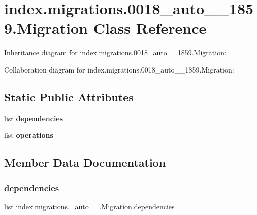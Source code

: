 \hypertarget{classindex_1_1migrations_1_10018__auto__20171025__1859_1_1Migration}{}\section{index.\+migrations.0018\+\_\+auto\+\_\+\_\+1859.Migration Class Reference}
\label{classindex_1_1migrations_1_10018__auto__20171025__1859_1_1Migration}


Inheritance diagram for index.\+migrations.0018\+\_\+auto\+\_\+\_\+1859.Migration\+:


Collaboration diagram for index.\+migrations.0018\+\_\+auto\+\_\+\_\+1859.Migration\+:
\subsection*{Static Public Attributes}
\begin{DoxyCompactItemize}
\item 
list {\bfseries dependencies}
\item 
list {\bfseries operations}
\end{DoxyCompactItemize}


\subsection{Member Data Documentation}
\mbox{\label{classindex_1_1migrations_1_10018__auto__20171025__1859_1_1Migration_a002cb5229fde9b1e812c128f4d869655}} 
\subsubsection{\texorpdfstring{dependencies}{dependencies}}
{\footnotesize\ttfamily list index.\+migrations.\+\_\+auto\+\_\+\_.\+Migration.\+dependencies\hspace{0.3cm}{\ttfamily [static]}}

